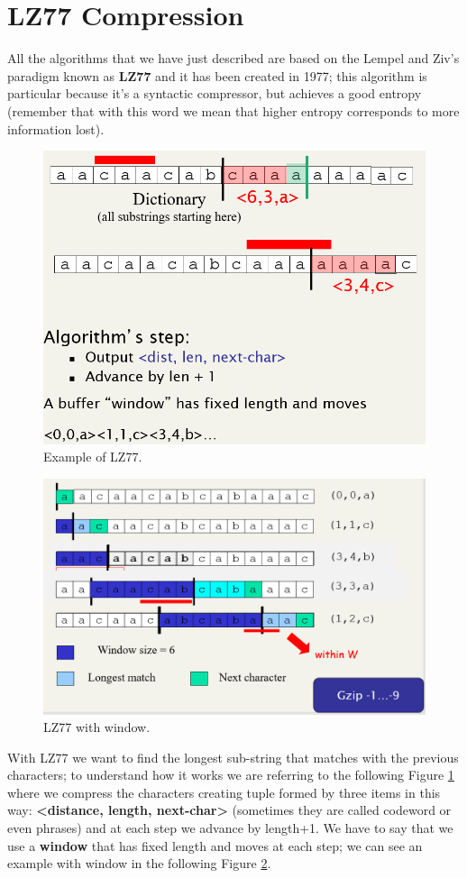 \section{LZ77 Compression}
All the algorithms that we have just described are based on the Lempel and Ziv's paradigm known as \textbf{LZ77} and it has been created in 1977; this algorithm is particular because it's a syntactic compressor, but achieves a good entropy (remember that with this word we mean that higher entropy corresponds to more information lost).\newline
\begin{figure}
    \centering
    \includegraphics[width=0.75\linewidth]{images/lz77.PNG}
    \caption{Example of LZ77.}
    \label{fig:lz77}
\end{figure}
\begin{figure}
    \centering
    \includegraphics[width=0.75\linewidth]{images/lz77window.PNG}
    \caption{LZ77 with window.}
    \label{fig:lz77window}
\end{figure}
With LZ77 we want to find the longest sub-string that matches with the previous characters; to understand how it works we are referring to the following Figure \ref{fig:lz77} where we compress the characters creating tuple formed by three items in this way: \textbf{<distance, length, next-char>} (sometimes they are called codeword or even phrases) and at each step we advance by length+1. We have to say that we use a \textbf{window} that has fixed length and moves at each step; we can see an example with window in the following Figure \ref{fig:lz77window}.\newline
